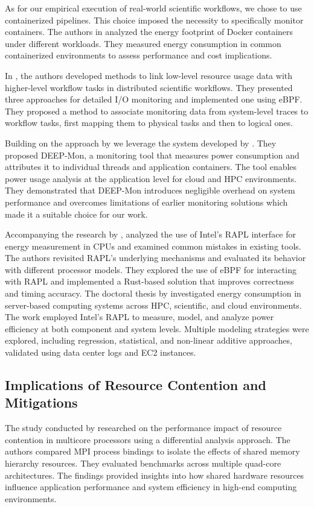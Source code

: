 As for our empirical execution of real-world scientific workflows, we chose to use containerized pipelines. This choice imposed the necessity to specifically monitor containers. The authors in \cite{10197087} analyzed the energy footprint of Docker containers under different workloads. They measured energy consumption in common containerized environments to assess performance and cost implications.

In \cite{Witzke2024}, the authors developed methods to link low-level resource usage data with higher-level workflow tasks in distributed scientific workflows. They presented three approaches for detailed I/O monitoring and implemented one using eBPF. They proposed a method to associate monitoring data from system-level traces to workflow tasks, first mapping them to physical tasks and then to logical ones.

Building on the approach by \cite{Witzke2024} we leverage the system developed by \cite{8425477}. They proposed DEEP-Mon, a monitoring tool that measures power consumption and attributes it to individual threads and application containers. The tool enables power usage analysis at the application level for cloud and HPC environments. They demonstrated that DEEP-Mon introduces negligible overhead on system performance and overcomes limitations of earlier monitoring solutions which made it a suitable choice for our work.

Accompanying the research by \cite{8425477}, \cite{Raffin2024} analyzed the use of Intel's RAPL interface for energy measurement in CPUs and examined common mistakes in existing tools. The authors revisited RAPL's underlying mechanisms and evaluated its behavior with different processor models. They explored the use of eBPF for interacting with RAPL and implemented a Rust-based solution that improves correctness and timing accuracy.
The doctoral thesis by \cite{khan2018energy} investigated energy consumption in server-based computing systems across HPC, scientific, and cloud environments. The work employed Intel's RAPL to measure, model, and analyze power efficiency at both component and system levels. Multiple modeling strategies were explored, including regression, statistical, and non-linear additive approaches, validated using data center logs and EC2 instances.

\subsection{Implications of Resource Contention and Mitigations}
\label{sec:relatedwork_contention}
The study conducted by \cite{5470399} researched on the performance impact of resource contention in multicore processors using a differential analysis approach. The authors compared MPI process bindings to isolate the effects of shared memory hierarchy resources. They evaluated benchmarks across multiple quad-core architectures. The findings provided insights into how shared hardware resources influence application performance and system efficiency in high-end computing environments.

